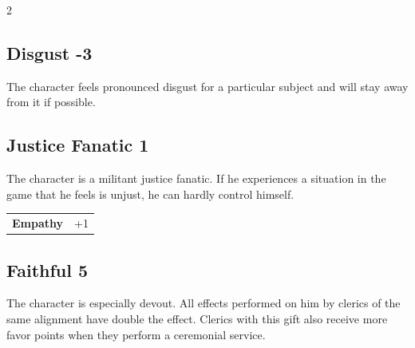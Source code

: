 \begin{multicols}{2}
\begin{tcolorbox}

\end{tcolorbox}

\begin{tcolorbox}
    \subsection*{Disgust \hfill \small{-3 }}
    \tcblower
The character feels pronounced disgust for a particular subject and will stay away from it if possible.


\vspace{3mm}



\end{tcolorbox}

\begin{tcolorbox}
    \subsection*{Justice Fanatic \hfill \small{1 }}
    \tcblower
The character is a militant justice fanatic. If he experiences a situation in the game that he feels is unjust, he can hardly control himself.


\vspace{3mm}

\begin{tabular}{@{}ll@{}}
    \textbf{Empathy} & +1\\
\end{tabular}


\end{tcolorbox}

\begin{tcolorbox}
    \subsection*{Faithful \hfill \small{5 }}
    \tcblower
The character is especially devout. All effects performed on him by clerics of the same alignment have double the effect. Clerics with this gift also receive more favor points when they perform a ceremonial service.



\end{tcolorbox}
\end{multicols}
